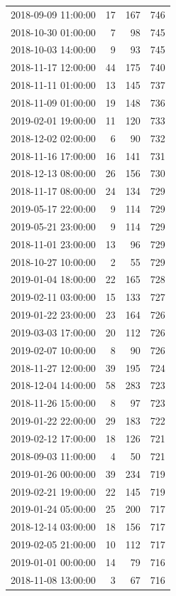 \begin{tabular}{lrrr}
2018-09-09 11:00:00 & 17 & 167 & 746 \\
2018-10-30 01:00:00 & 7 & 98 & 745 \\
2018-10-03 14:00:00 & 9 & 93 & 745 \\
2018-11-17 12:00:00 & 44 & 175 & 740 \\
2018-11-11 01:00:00 & 13 & 145 & 737 \\
2018-11-09 01:00:00 & 19 & 148 & 736 \\
2019-02-01 19:00:00 & 11 & 120 & 733 \\
2018-12-02 02:00:00 & 6 & 90 & 732 \\
2018-11-16 17:00:00 & 16 & 141 & 731 \\
2018-12-13 08:00:00 & 26 & 156 & 730 \\
2018-11-17 08:00:00 & 24 & 134 & 729 \\
2019-05-17 22:00:00 & 9 & 114 & 729 \\
2019-05-21 23:00:00 & 9 & 114 & 729 \\
2018-11-01 23:00:00 & 13 & 96 & 729 \\
2018-10-27 10:00:00 & 2 & 55 & 729 \\
2019-01-04 18:00:00 & 22 & 165 & 728 \\
2019-02-11 03:00:00 & 15 & 133 & 727 \\
2019-01-22 23:00:00 & 23 & 164 & 726 \\
2019-03-03 17:00:00 & 20 & 112 & 726 \\
2019-02-07 10:00:00 & 8 & 90 & 726 \\
2018-11-27 12:00:00 & 39 & 195 & 724 \\
2018-12-04 14:00:00 & 58 & 283 & 723 \\
2018-11-26 15:00:00 & 8 & 97 & 723 \\
2019-01-22 22:00:00 & 29 & 183 & 722 \\
2019-02-12 17:00:00 & 18 & 126 & 721 \\
2018-09-03 11:00:00 & 4 & 50 & 721 \\
2019-01-26 00:00:00 & 39 & 234 & 719 \\
2019-02-21 19:00:00 & 22 & 145 & 719 \\
2019-01-24 05:00:00 & 25 & 200 & 717 \\
2018-12-14 03:00:00 & 18 & 156 & 717 \\
2019-02-05 21:00:00 & 10 & 112 & 717 \\
2019-01-01 00:00:00 & 14 & 79 & 716 \\
2018-11-08 13:00:00 & 3 & 67 & 716 \\

\end{tabular}
